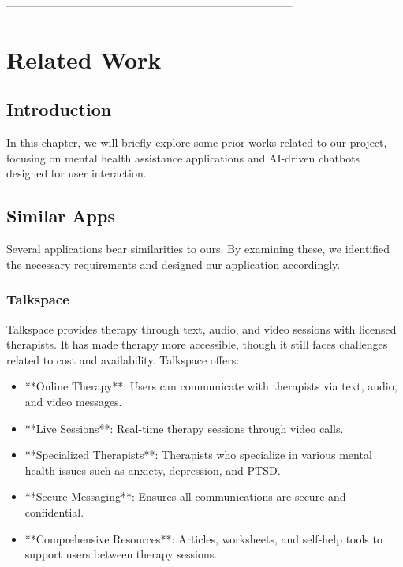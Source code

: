  ------------------------------------------------------------------------------

\chapter{Related Work}
\section{Introduction}
In this chapter, we will briefly explore some prior works related to our project, focusing on mental health assistance applications and AI-driven chatbots designed for user interaction.

\section{Similar Apps}
Several applications bear similarities to ours. By examining these, we identified the necessary requirements and designed our application accordingly.

\subsection{Talkspace}
Talkspace provides therapy through text, audio, and video sessions with licensed therapists. It has made therapy more accessible, though it still faces challenges related to cost and availability. Talkspace offers:
\begin{itemize}
    \item **Online Therapy**: Users can communicate with therapists via text, audio, and video messages.
    \item **Live Sessions**: Real-time therapy sessions through video calls.
    \item **Specialized Therapists**: Therapists who specialize in various mental health issues such as anxiety, depression, and PTSD.
    \item **Secure Messaging**: Ensures all communications are secure and confidential.
    \item **Comprehensive Resources**: Articles, worksheets, and self-help tools to support users between therapy sessions.
\end{itemize}

